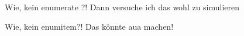 

                    {Wie, kein enumerate ?! Dann versuche ich das wohl zu simulieren}
                    {} 
                    {}{}


                    {Wie, kein enumitem?! Das könnte aua machen!}
                    {} 
                    {}{\newenvironment{enumeratea}[1][,]{\begin{enumerate}[label=\alph*),##1]}{\end{enumerate}}} %





